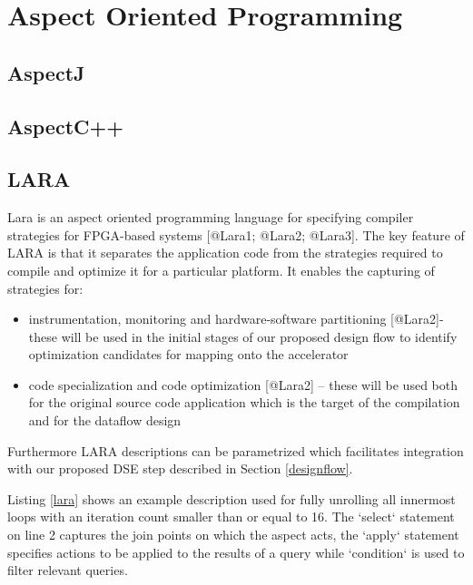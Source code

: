 \section{Aspect Oriented Programming}

\subsection{AspectJ}

\subsection{AspectC++}

\subsection{LARA}

Lara is an aspect oriented programming language for specifying
compiler strategies for FPGA-based systems
[@Lara1; @Lara2; @Lara3]. The key feature of LARA is that it separates
the application code from the strategies required to compile and
optimize it for a particular platform. It enables the capturing of
strategies for:

\begin{itemize}
\item instrumentation, monitoring and hardware-software partitioning
  [@Lara2]- these will be used in the initial stages of our proposed
  design flow to identify optimization candidates for mapping onto
  the accelerator

\item code specialization and code optimization [@Lara2] -- these will be
  used both for the original source code application which is the
  target of the compilation and for the dataflow design
\end{itemize}

Furthermore LARA descriptions can be parametrized which facilitates
integration with our proposed DSE step described in Section
\ref{designflow}.

Listing \ref{lara} shows an example description used for fully
unrolling all innermost loops with an iteration count smaller than or
equal to 16. The `select` statement on line 2 captures the join points
on which the aspect acts, the `apply` statement specifies actions to
be applied to the results of a query while `condition` is used to
filter relevant queries.


